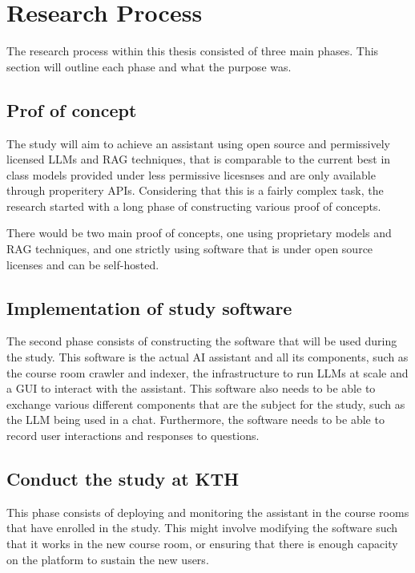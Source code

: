 \section{Research Process}
\label{sec:research_process}


The research process within this thesis consisted of three main phases. This section will outline each phase and what the purpose was.


\subsection{Prof of concept}


The study will aim to achieve an assistant using open source and permissively licensed \gls{LLM}s and \gls{RAG} techniques, that is comparable to the current best in class models provided under less permissive licesnses and are only available through properitery APIs. Considering that this is a fairly complex task, the research started with a long phase of constructing various proof of concepts.


There would be two main proof of concepts, one using proprietary models and \gls{RAG} techniques, and one strictly using software that is under open source licenses and can be self-hosted.


\subsection{Implementation of study software}


The second phase consists of constructing the software that will be used during the study. This software is the actual AI assistant and all its components, such as the course room crawler and indexer, the infrastructure to run \gls{LLM}s at scale and a \gls{GUI} to interact with the assistant. This software also needs to be able to exchange various different components that are the subject for the study, such as the \gls{LLM} being used in a chat. Furthermore, the software needs to be able to record user interactions and responses to questions.


\subsection{Conduct the study at KTH}


This phase consists of deploying and monitoring the assistant in the course rooms that have enrolled in the study. This might involve modifying the software such that it works in the new course room, or ensuring that there is enough capacity on the platform to sustain the new users.


